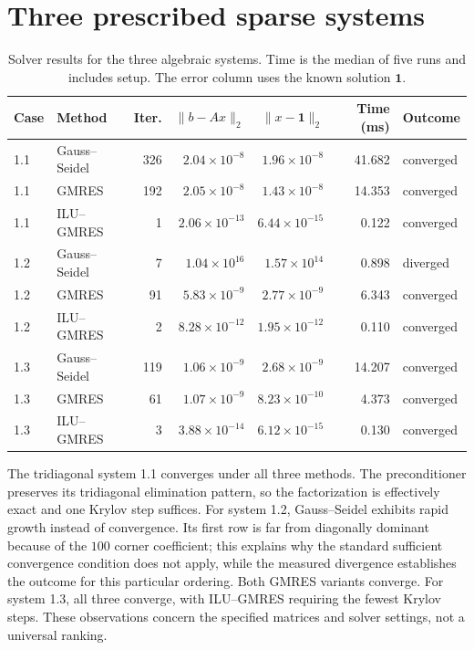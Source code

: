 \documentclass[a4paper,11pt]{article}
\begin{document}
\section{Three prescribed sparse systems}
\begin{table}[ht]\centering\small
\caption{Solver results for the three algebraic systems. Time is the median of five runs and includes setup. The error column uses the known solution $\mathbf{1}$.}
\begin{tabular}{llrrrrl}\toprule
Case & Method & Iter. & $\|b-Ax\|_2$ & $\|x-\mathbf{1}\|_2$ & Time (ms) & Outcome\\\midrule
1.1 & Gauss--Seidel & 326 & $2.04\times10^{-8}$ & $1.96\times10^{-8}$ & 41.682 & converged \\
1.1 & GMRES & 192 & $2.05\times10^{-8}$ & $1.43\times10^{-8}$ & 14.353 & converged \\
1.1 & ILU--GMRES & 1 & $2.06\times10^{-13}$ & $6.44\times10^{-15}$ & 0.122 & converged \\
\midrule
1.2 & Gauss--Seidel & 7 & $1.04\times10^{16}$ & $1.57\times10^{14}$ & 0.898 & diverged \\
1.2 & GMRES & 91 & $5.83\times10^{-9}$ & $2.77\times10^{-9}$ & 6.343 & converged \\
1.2 & ILU--GMRES & 2 & $8.28\times10^{-12}$ & $1.95\times10^{-12}$ & 0.110 & converged \\
\midrule
1.3 & Gauss--Seidel & 119 & $1.06\times10^{-9}$ & $2.68\times10^{-9}$ & 14.207 & converged \\
1.3 & GMRES & 61 & $1.07\times10^{-9}$ & $8.23\times10^{-10}$ & 4.373 & converged \\
1.3 & ILU--GMRES & 3 & $3.88\times10^{-14}$ & $6.12\times10^{-15}$ & 0.130 & converged \\
\bottomrule\end{tabular}\end{table}

The tridiagonal system 1.1 converges under all three methods. The preconditioner preserves its tridiagonal elimination pattern, so the factorization is effectively exact and one Krylov step suffices. For system 1.2, Gauss--Seidel exhibits rapid growth instead of convergence. Its first row is far from diagonally dominant because of the $100$ corner coefficient; this explains why the standard sufficient convergence condition does not apply, while the measured divergence establishes the outcome for this particular ordering. Both GMRES variants converge. For system 1.3, all three converge, with ILU--GMRES requiring the fewest Krylov steps. These observations concern the specified matrices and solver settings, not a universal ranking.
\end{document}
